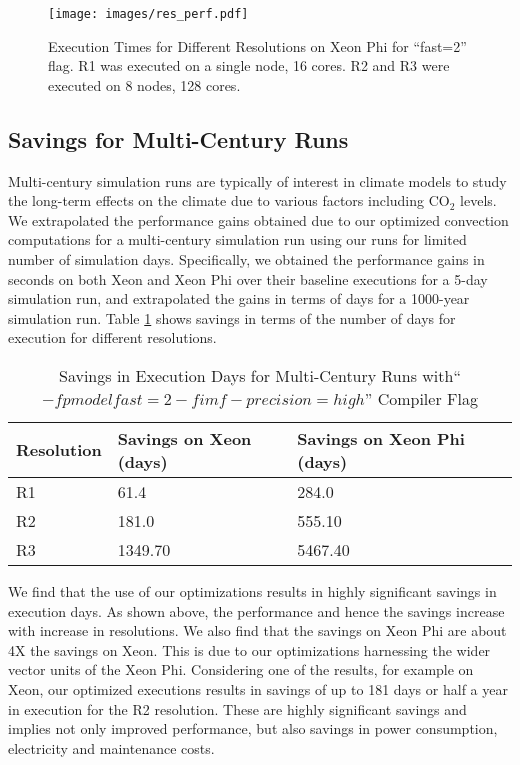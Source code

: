 \begin {figure}
\centering
\texttt{[image: images/res\_perf.pdf]}
\caption{Execution Times for Different Resolutions on Xeon Phi for ``fast=2'' flag. R1 was executed on a single node, 16 cores. R2 and R3 were executed on 8 nodes, 128 cores.}
\label{res_perf}
\end{figure}

\subsection{Savings for Multi-Century Runs}

Multi-century simulation runs are typically of interest in climate models to study the long-term effects on the climate due to various factors including CO$_{2}$ levels. We extrapolated the performance gains obtained due to our optimized convection computations for a multi-century simulation run using our runs for limited number of simulation days. Specifically, we obtained the performance gains in seconds on both Xeon and Xeon Phi over their baseline executions for a 5-day simulation run, and extrapolated the gains in terms of days for a 1000-year simulation run. Table \ref{multi_century_savings} shows savings in terms of the number of days for execution for different resolutions.

\begin{table}
\small
\centering
\begin{tabular}{|p{0.8in}|p{1.0in}|p{1.0in}|p{1.0in}|}
\hline
Resolution & Savings on Xeon (days) & Savings on Xeon Phi (days) \\
\hline
R1 & 61.4 & 284.0 \\
R2 & 181.0 & 555.10 \\
R3 &  1349.70 & 5467.40 \\
\hline
\end{tabular}
\caption{Savings in Execution Days for Multi-Century Runs with``$-fp model fast=2 -fimf-precision=high$'' Compiler Flag}
\label{multi_century_savings}
\end{table}

We find that the use of our optimizations results in highly significant savings in execution days.
As shown above, the performance and hence the savings increase with increase in resolutions. We also find that the savings on Xeon Phi are about 4X the savings on Xeon. This is due to our optimizations harnessing the wider vector units of the Xeon Phi.
Considering one of the results, for example on Xeon, our optimized executions results in savings of up to 181 days or half a year in execution for the R2 resolution. These are highly significant savings and implies not only improved performance, but also savings in power consumption, electricity and maintenance costs.
